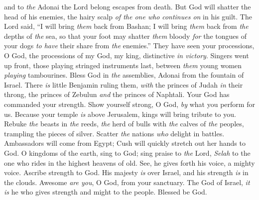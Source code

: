 \begin{biblechapter}
and to \textit{the} Adonai the Lord belong escapes from death.
\verse But God will shatter the head of his enemies, 
the hairy scalp \textit{of the one who} \textit{continues on} in his guilt.
\verse The Lord said, “I will bring \textit{them} back from Bashan; 
I will bring \textit{them} back from \textit{the} depths of \textit{the} sea,
\verse so that your foot may shatter \textit{them} bloody 
\textit{for} the tongues of your dogs \textit{to have} their share from \textit{the} enemies.”
\verse They have seen your processions, O God, 
the processions of my God, my king, distinctive \textit{in victory}.
\verse Singers went up front, those playing stringed instruments last, 
between \textit{them} young women \textit{playing} tambourines.
\verse Bless God in \textit{the} assemblies, 
Adonai from the fountain of Israel.
\verse There \textit{is} little Benjamin ruling them, 
\textit{with} the princes of Judah \textit{in} their throng, 
the princes of Zebulun \textit{and} the princes of Naphtali.
\verse Your God has commanded your strength. 
Show yourself strong, O God, \textit{by} what you perform for us.
\verse Because your temple \textit{is} above Jerusalem, 
kings will bring tribute to you.
\verse Rebuke \textit{the} beasts in \textit{the} reeds, 
\textit{the} herd of bulls with \textit{the} calves of \textit{the} peoples, 
trampling the pieces of silver. 
Scatter \textit{the} nations \textit{who} delight in battles.
\verse Ambassadors will come from Egypt; 
Cush will quickly stretch out her hands to God.
\verse O kingdoms of the earth, sing to God; 
sing praise to \textit{the} Lord, \textit{Selah}
\verse to the one who rides in the highest heavens of old. 
See, he gives forth his voice, a mighty voice.
\verse Ascribe strength to God. 
His majesty \textit{is} over Israel, 
and his strength \textit{is} in the clouds.
\verse Awesome \textit{are you}, O God, from your sanctuary. 
The God of Israel, \textit{it is} he who gives strength and might to the people. 
Blessed be God.
\end{biblechapter}

